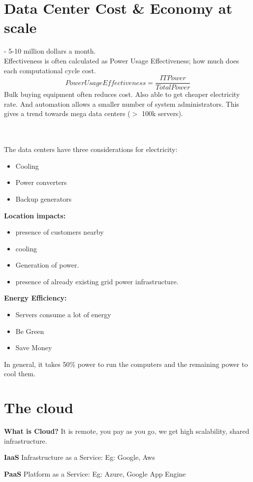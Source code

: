\documentclass[twoside]{article}
\begin{document}
\section{Data Center Cost \& Economy at scale }
- 5-10 million dollars a month.\\
Effectiveness is often calculated as Power Usage Effectiveness; how much does each computational cycle cost.
$${Power Usage Effectiveness} =\frac{{IT Power}}{{Total Power}}$$
Bulk buying equipment often reduces cost. Also able to get cheaper electricity rate. And automation allows a smaller number of system administrators. This gives a trend towards mega data centers ($>$ 100k servers). 

\\\\
The data centers have three considerations for electricity:
\begin{itemize}
    \item Cooling
    \item Power converters
    \item Backup generators
\end{itemize}


 \textbf{Location impacts:} 
 \begin{itemize}
  \item presence of customers nearby
  \item cooling
  \item Generation of power.
  \item presence of already existing grid power infrastructure.
\end{itemize}

\textbf{Energy Efficiency:} 
\begin{itemize}
  \item Servers consume a lot of energy
  \item Be Green
  \item Save Money
\end{itemize}
In general, it takes 50\% power to run the computers and the remaining power to cool them.
 

\section{The cloud}
\textbf{What is Cloud?} It is remote, you pay as you go, we get high scalability, shared infrastructure. 

\textbf{IaaS} Infrastructure as a Service: Eg: Google, Aws

\textbf{PaaS} Platform as a Service: Eg: Azure, Google App Engine
\end{document}
